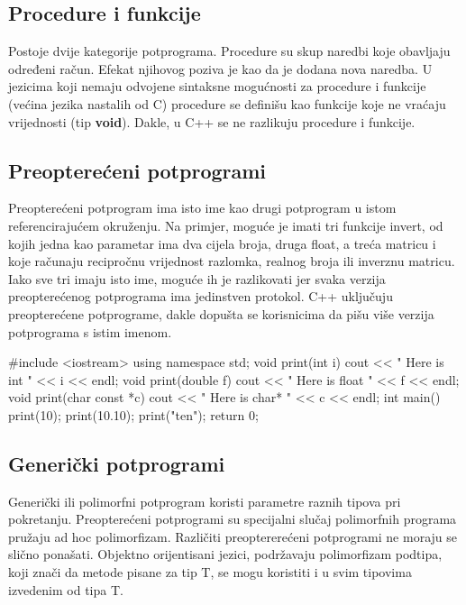 \documentclass[11pt]{book}
\begin{document}
\subsection{Procedure i funkcije}  %


Postoje  dvije  kategorije  potprograma.  Procedure  su  skup  naredbi  koje  obavljaju određeni račun. Efekat njihovog poziva je kao da je dodana nova naredba. U jezicima koji nemaju odvojene sintaksne mogućnosti za procedure i funkcije (većina jezika nastalih od C) procedure se definišu kao funkcije koje ne vraćaju vrijednosti (tip \textbf{void}). Dakle, u C++ se ne razlikuju procedure i funkcije.


\subsection{Preopterećeni potprogrami}

Preopterećeni potprogram ima isto ime kao drugi potprogram u istom referencirajućem okruženju. Na primjer, moguće je imati tri funkcije invert, od kojih jedna kao parametar ima dva cijela broja, druga float, a treća matricu i koje računaju recipročnu vrijednost razlomka, realnog broja ili inverznu matricu. Iako sve tri imaju isto ime, moguće ih je razlikovati jer svaka verzija preopterećenog potprograma ima jedinstven protokol. C++ uključuju preopterećene potprograme, dakle dopušta se korisnicima da pišu više verzija potprograma s istim imenom.

\begin{shortlisting}
  #include <iostream>
  using namespace std;
  void print(int i) {
      cout << " Here is int " << i << endl;
    }
  void print(double  f) {
      cout << " Here is float " << f << endl;
    }
  void print(char const *c) {
      cout << " Here is char* " << c << endl;
    }
  int main() {
      print(10);
      print(10.10);
      print("ten");
      return 0;
    }
\end{shortlisting}

\subsection{Generički potprogrami}
Generički ili polimorfni potprogram koristi parametre raznih tipova pri pokretanju. Preopterećeni potprogrami su specijalni slučaj polimorfnih programa pružaju ad hoc polimorfizam. Različiti preoptererećeni potprogrami ne moraju se slično ponašati. Objektno orijentisani jezici, podržavaju polimorfizam podtipa, koji znači da metode pisane za tip T, se mogu koristiti i u svim tipovima izvedenim od tipa T.
\end{document}
